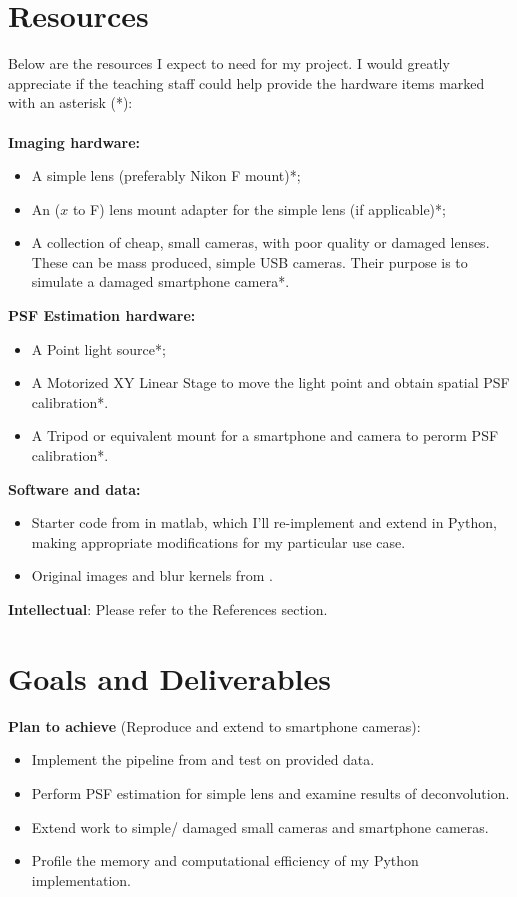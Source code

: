 \documentclass{article}
\begin{document}
\section{Resources}
Below are the resources I expect to need for my project. I would greatly appreciate if the teaching staff could help provide the hardware items marked with an asterisk (*):\\\\
\textbf{Imaging hardware:}
\begin{itemize}
    \item A simple lens (preferably Nikon F mount)*;
    \item An ($x$ to F) lens mount adapter for the simple lens (if applicable)*;
    \item A collection of cheap, small cameras, with poor quality or damaged lenses. These can be mass produced, simple USB cameras. Their purpose is to simulate a damaged smartphone camera*.
\end{itemize}

\textbf{PSF Estimation hardware:}
\begin{itemize}
    \item A Point light source*;
    \item A Motorized XY Linear Stage to move the light point and obtain spatial PSF calibration*.
    \item A Tripod or equivalent mount for a smartphone and camera to perorm PSF calibration*.
\end{itemize}
\clearpage

\textbf{Software and data:}
\begin{itemize}
    \item Starter code from \cite{simplelens} in matlab, which I'll re-implement and extend in Python, making appropriate modifications for my particular use case. 
    \item Original images and blur kernels from \cite{simplelens}.
\end{itemize}

\textbf{Intellectual}: Please refer to the References section.

\section{Goals and Deliverables}
\textbf{Plan to achieve} (Reproduce \cite{simplelens} and extend to smartphone cameras):
\begin{itemize}
    \item Implement the pipeline from \cite{simplelens} and test on provided data.
    \item Perform PSF estimation for simple lens and examine results of deconvolution.
    \item Extend work to simple/ damaged small cameras and smartphone cameras.
    \item Profile the memory and computational efficiency of my Python implementation.
\end{itemize}
\end{document}
